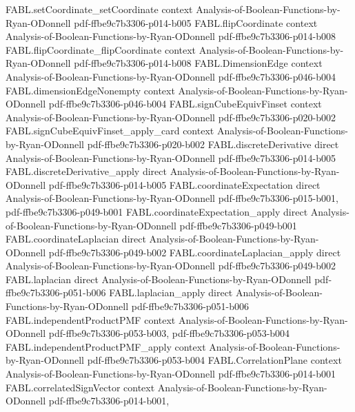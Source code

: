 \begin{theorem}
  {FABL.setCoordinate_setCoordinate}
  {context}
  {Analysis-of-Boolean-Functions-by-Ryan-ODonnell}
  {pdf-ffbe9c7b3306-p014-b005}
\proofstep
  {FABL.flipCoordinate}
  {context}
  {Analysis-of-Boolean-Functions-by-Ryan-ODonnell}
  {pdf-ffbe9c7b3306-p014-b008}
\proofstep
  {FABL.flipCoordinate_flipCoordinate}
  {context}
  {Analysis-of-Boolean-Functions-by-Ryan-ODonnell}
  {pdf-ffbe9c7b3306-p014-b008}
\proofstep
  {FABL.DimensionEdge}
  {context}
  {Analysis-of-Boolean-Functions-by-Ryan-ODonnell}
  {pdf-ffbe9c7b3306-p046-b004}
\proofstep
  {FABL.dimensionEdgeNonempty}
  {context}
  {Analysis-of-Boolean-Functions-by-Ryan-ODonnell}
  {pdf-ffbe9c7b3306-p046-b004}
\proofstep
  {FABL.signCubeEquivFinset}
  {context}
  {Analysis-of-Boolean-Functions-by-Ryan-ODonnell}
  {pdf-ffbe9c7b3306-p020-b002}
\proofstep
  {FABL.signCubeEquivFinset_apply_card}
  {context}
  {Analysis-of-Boolean-Functions-by-Ryan-ODonnell}
  {pdf-ffbe9c7b3306-p020-b002}
\proofstep
  {FABL.discreteDerivative}
  {direct}
  {Analysis-of-Boolean-Functions-by-Ryan-ODonnell}
  {pdf-ffbe9c7b3306-p014-b005}
\proofstep
  {FABL.discreteDerivative_apply}
  {direct}
  {Analysis-of-Boolean-Functions-by-Ryan-ODonnell}
  {pdf-ffbe9c7b3306-p014-b005}
\proofstep
  {FABL.coordinateExpectation}
  {direct}
  {Analysis-of-Boolean-Functions-by-Ryan-ODonnell}
  {pdf-ffbe9c7b3306-p015-b001,
    pdf-ffbe9c7b3306-p049-b001}
\proofstep
  {FABL.coordinateExpectation_apply}
  {direct}
  {Analysis-of-Boolean-Functions-by-Ryan-ODonnell}
  {pdf-ffbe9c7b3306-p049-b001}
\proofstep
  {FABL.coordinateLaplacian}
  {direct}
  {Analysis-of-Boolean-Functions-by-Ryan-ODonnell}
  {pdf-ffbe9c7b3306-p049-b002}
\proofstep
  {FABL.coordinateLaplacian_apply}
  {direct}
  {Analysis-of-Boolean-Functions-by-Ryan-ODonnell}
  {pdf-ffbe9c7b3306-p049-b002}
\proofstep
  {FABL.laplacian}
  {direct}
  {Analysis-of-Boolean-Functions-by-Ryan-ODonnell}
  {pdf-ffbe9c7b3306-p051-b006}
\proofstep
  {FABL.laplacian_apply}
  {direct}
  {Analysis-of-Boolean-Functions-by-Ryan-ODonnell}
  {pdf-ffbe9c7b3306-p051-b006}
\proofstep
  {FABL.independentProductPMF}
  {context}
  {Analysis-of-Boolean-Functions-by-Ryan-ODonnell}
  {pdf-ffbe9c7b3306-p053-b003,
    pdf-ffbe9c7b3306-p053-b004}
\proofstep
  {FABL.independentProductPMF_apply}
  {context}
  {Analysis-of-Boolean-Functions-by-Ryan-ODonnell}
  {pdf-ffbe9c7b3306-p053-b004}
\proofstep
  {FABL.CorrelationPlane}
  {context}
  {Analysis-of-Boolean-Functions-by-Ryan-ODonnell}
  {pdf-ffbe9c7b3306-p014-b001}
\proofstep
  {FABL.correlatedSignVector}
  {context}
  {Analysis-of-Boolean-Functions-by-Ryan-ODonnell}
  {pdf-ffbe9c7b3306-p014-b001,
}
\end{theorem}
